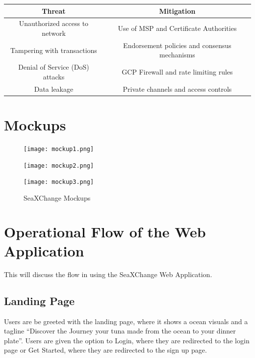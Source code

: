 \begin{table}[h]
	\centering
	\begin{tabular}{|c|c|}
		\hline
		\textbf{Threat} & \textbf{Mitigation} \\
		\hline
		Unauthorized access to network & Use of MSP and Certificate Authorities \\
		\hline
		Tampering with transactions & Endorsement policies and consensus mechanisms \\
		\hline
		Denial of Service (DoS) attacks & GCP Firewall and rate limiting rules \\
		\hline
		Data leakage & Private channels and access controls \\
		\hline
	\end{tabular}
\end{table}

\section{Mockups}
\begin{figure}[H]
	\centering
	\texttt{[image: mockup1.png]}
	
	\vspace{20pt} %
	
	\texttt{[image: mockup2.png]}
\end{figure}

\clearpage %


\begin{figure}[H]
	\centering
	\texttt{[image: mockup3.png]}
	\caption{SeaXChange Mockups}
	\label{fig:eight_step}
\end{figure}


\section{Operational Flow of the Web Application}
This will discuss the flow in using the SeaXChange Web Application.

\subsection{Landing Page}
Users are be greeted with the landing page, where it shows a ocean visuals and a tagline “Discover the Journey your tuna made from the ocean to your dinner plate”. Users are given the option to Login, where they are redirected to the login page or Get Started, where they are redirected to the sign up page. 

